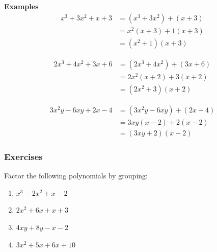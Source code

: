 \documentclass[12pt]{article}
\begin{document}
\textbf{Examples}
\begin{align*}
x^3 + 3x^2 + x + 3 &= (x^3 + 3x^2) + (x + 3)\\
                   &= x^2(x + 3) + 1(x + 3)\\
                   &= (x^2 + 1)(x + 3)
\end{align*}

\begin{align*}
2x^3 + 4x^2 + 3x + 6 &= (2x^3 + 4x^2) + (3x + 6)\\
                     &= 2x^2(x + 2) + 3(x + 2)\\
                     &= (2x^2 + 3)(x + 2)
\end{align*}

\begin{align*}
3x^2y - 6xy + 2x - 4 &= (3x^2y - 6xy) + (2x - 4)\\
                     &= 3xy(x - 2) + 2(x - 2)\\
                     &= (3xy + 2)(x - 2)
\end{align*}

\subsubsection*{Exercises}
Factor the following polynomials by grouping:
\begin{multicols}{2}
\begin{enumerate}
    \item $x^3 - 2x^2 + x - 2$
    \item $2x^2 + 6x + x + 3$
    \item $4xy + 8y - x - 2$
    \item $3x^2 + 5x + 6x + 10$
\end{enumerate}
\end{multicols}
\end{document}
